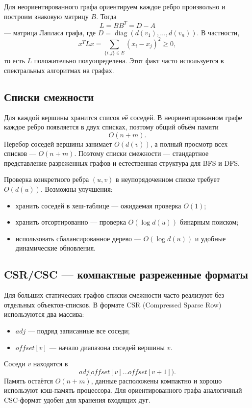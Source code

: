 Для неориентированного графа ориентируем каждое ребро произвольно и построим
знаковую матрицу $B$. Тогда
\[
 L=BB^T=D-A
\]
--- матрица Лапласа графа, где $D=\operatorname{diag}(d(v_1),\ldots,d(v_n))$.
В частности,
\[
 x^TLx=\sum_{\{i,j\}\in E}(x_i-x_j)^2\ge0,
\]
то есть $L$ положительно полуопределена. Этот факт часто используется в
спектральных алгоритмах на графах.

\subsection{Списки смежности}

Для каждой вершины хранится список её соседей. В неориентированном графе каждое
ребро появляется в двух списках, поэтому общий объём памяти
\[
 O(n+m).
\]
Перебор соседей вершины занимает $O(d(v))$, а полный просмотр всех списков ---
$O(n+m)$. Поэтому списки смежности --- стандартное представление разреженных
графов и естественная структура для BFS и DFS.

Проверка конкретного ребра $(u,v)$ в неупорядоченном списке требует
$O(d(u))$. Возможны улучшения:
\begin{itemize}
 \item хранить соседей в хеш-таблице --- ожидаемая проверка $O(1)$;
 \item хранить отсортированно --- проверка $O(\log d(u))$ бинарным поиском;
 \item использовать сбалансированное дерево --- $O(\log d(u))$ и удобные
       динамические обновления.
\end{itemize}

\subsection{CSR/CSC --- компактные разреженные форматы}

Для больших статических графов списки смежности часто реализуют без отдельных
объектов-списков. В формате CSR (Compressed Sparse Row) используются два массива:
\begin{itemize}
 \item $adj$ --- подряд записанные все соседи;
 \item $offset[v]$ --- начало диапазона соседей вершины $v$.
\end{itemize}
Соседи $v$ находятся в
\[
 adj[offset[v] \ldots offset[v+1]).
\]
Память остаётся $O(n+m)$, данные расположены компактно и хорошо используют
кэш-память процессора. Для ориентированного графа аналогичный CSC-формат удобен
для хранения входящих дуг.

